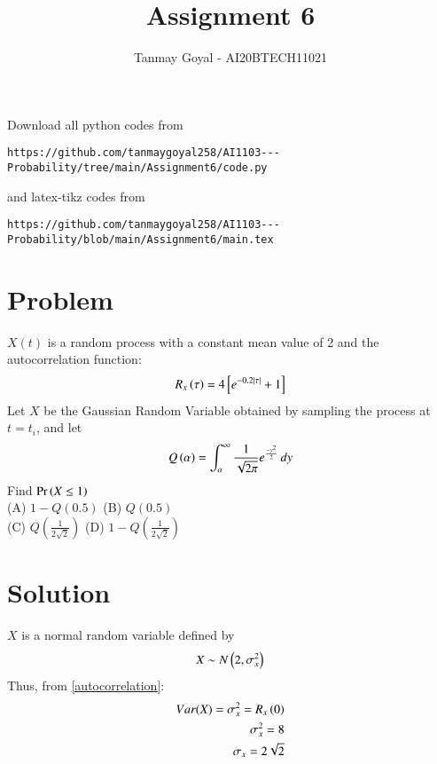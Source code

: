 \documentclass[journal,12pt,twocolumn]{IEEEtran}
\begin{document}
\def\putbox#1#2#3{\makebox[0in][l]{\makebox[#1][l]{}\raisebox{\baselineskip}[0in][0in]{\raisebox{#2}[0in][0in]{#3}}}}
     \def\rightbox#1{\makebox[0in][r]{#1}}
     \def\centbox#1{\makebox[0in]{#1}}
     \def\topbox#1{\raisebox{-\baselineskip}[0in][0in]{#1}}
     \def\midbox#1{\raisebox{-0.5\baselineskip}[0in][0in]{#1}}
\vspace{3cm}
\title{Assignment 6}
\author{Tanmay Goyal - AI20BTECH11021}
\maketitle
\newpage
\bigskip
\renewcommand{\thefigure}{\theenumi}
\renewcommand{\thetable}{\theenumi}
Download all python codes from 
\begin{lstlisting}
https://github.com/tanmaygoyal258/AI1103---Probability/tree/main/Assignment6/code.py
\end{lstlisting}
%
and latex-tikz codes from 
%
\begin{lstlisting}
https://github.com/tanmaygoyal258/AI1103---Probability/blob/main/Assignment6/main.tex
\end{lstlisting}
\section{Problem}
$X(t)$ is a random process with a constant mean value of 2 and the autocorrelation function:
\begin{align}
    R_x\left(\tau\right) = 4{}\left[e^{-0.2|\tau|} + 1\right]
    \label{autocorrelation}
\end{align}
Let $X$ be the Gaussian Random Variable obtained by sampling the process at $t = t_i$, and let 
\begin{align}
    Q\left(\alpha\right) = \int_{\alpha}^{\infty} \frac{1}{\sqrt{2\pi}} e^{\frac{-y^2}{2}}\,dy
    \label{Q}
\end{align}
Find $\Pr\left(X \leq 1\right)$\\
(A) \(1 - Q(0.5)\) \hspace{1cm}
(B) \(Q(0.5)\) \\
(C) \(Q(\frac{1}{2\sqrt{2}})\) \hspace{1.6cm}
(D) \(1 - Q(\frac{1}{2\sqrt{2}})\)\\

\section{Solution}
$X$ is a normal random variable defined by 
\begin{align}
    X \sim N\left(2 , \sigma_x^2 \right)
\end{align}
Thus, from \eqref{autocorrelation}:
\begin{align}
    Var(X) = \sigma_x^2 = R_x\left(0\right)\\
     \sigma_x^2 = 8\\
     \sigma_x = 2\sqrt{2}
\end{align}
\end{document}
